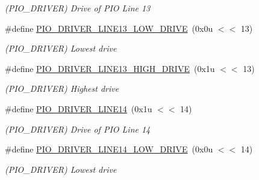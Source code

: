\begin{DoxyCompactItemize}
\begin{DoxyCompactList}\small\item\em (P\+I\+O\+\_\+\+D\+R\+I\+V\+ER) Drive of P\+IO Line 13 \end{DoxyCompactList}\item 
\mbox{\label{group__SAMV71__PIO_ga6c7d75cdc8fc502ca1591322df59ee65}} 
\#define \mbox{\hyperlink{group__SAMV71__PIO_ga6c7d75cdc8fc502ca1591322df59ee65}{P\+I\+O\+\_\+\+D\+R\+I\+V\+E\+R\+\_\+\+L\+I\+N\+E13\+\_\+\+L\+O\+W\+\_\+\+D\+R\+I\+VE}}~(0x0u $<$$<$ 13)
\begin{DoxyCompactList}\small\item\em (P\+I\+O\+\_\+\+D\+R\+I\+V\+ER) Lowest drive \end{DoxyCompactList}\item 
\mbox{\label{group__SAMV71__PIO_ga35cfa7a75637d43bd35b6583801bacac}} 
\#define \mbox{\hyperlink{group__SAMV71__PIO_ga35cfa7a75637d43bd35b6583801bacac}{P\+I\+O\+\_\+\+D\+R\+I\+V\+E\+R\+\_\+\+L\+I\+N\+E13\+\_\+\+H\+I\+G\+H\+\_\+\+D\+R\+I\+VE}}~(0x1u $<$$<$ 13)
\begin{DoxyCompactList}\small\item\em (P\+I\+O\+\_\+\+D\+R\+I\+V\+ER) Highest drive \end{DoxyCompactList}\item 
\mbox{\label{group__SAMV71__PIO_ga397e14fa6b7191bd73435f296c3227b8}} 
\#define \mbox{\hyperlink{group__SAMV71__PIO_ga397e14fa6b7191bd73435f296c3227b8}{P\+I\+O\+\_\+\+D\+R\+I\+V\+E\+R\+\_\+\+L\+I\+N\+E14}}~(0x1u $<$$<$ 14)
\begin{DoxyCompactList}\small\item\em (P\+I\+O\+\_\+\+D\+R\+I\+V\+ER) Drive of P\+IO Line 14 \end{DoxyCompactList}\item 
\mbox{\label{group__SAMV71__PIO_ga7225d4170b069ead324bfaa2259dd72f}} 
\#define \mbox{\hyperlink{group__SAMV71__PIO_ga7225d4170b069ead324bfaa2259dd72f}{P\+I\+O\+\_\+\+D\+R\+I\+V\+E\+R\+\_\+\+L\+I\+N\+E14\+\_\+\+L\+O\+W\+\_\+\+D\+R\+I\+VE}}~(0x0u $<$$<$ 14)
\begin{DoxyCompactList}\small\item\em (P\+I\+O\+\_\+\+D\+R\+I\+V\+ER) Lowest drive \end{DoxyCompactList}\item 

\end{DoxyCompactItemize}
